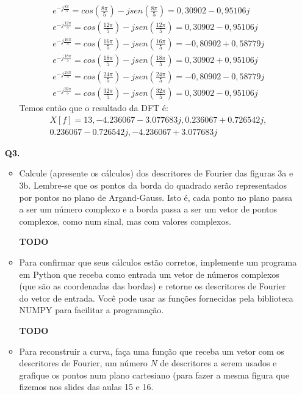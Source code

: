 \documentclass[12pt]{article}
\begin{document}
\begin{itemize}
\begin{itemize}
\begin{align*}
    &e^{-j\frac{8\pi}{5}} = cos(\frac{8\pi}{5}) - jsen(\frac{8\pi}{5}) = 0,30902  - 0,95106j &\\
    &e^{-j\frac{12\pi}{5}} = cos(\frac{12\pi}{5}) - jsen(\frac{12\pi}{5}) = 0,30902	-0,95106j &\\
    &e^{-j\frac{16\pi}{5}} = cos(\frac{16\pi}{5}) - jsen(\frac{16\pi}{5}) = -0,80902 + 0,58779j &\\
    &e^{-j\frac{18\pi}{5}} = cos(\frac{18\pi}{5}) - jsen(\frac{18\pi}{5}) = 0,30902 + 0,95106j &\\
    &e^{-j\frac{24\pi}{5}} = cos(\frac{24\pi}{5}) - jsen(\frac{24\pi}{5}) = -0,80902 - 0,58779j &\\
    &e^{-j\frac{32\pi}{5}} = cos(\frac{32\pi}{5}) - jsen(\frac{32\pi}{5}) = 0,30902	- 0,95106j&
\end{align*}
Temos então que o resultado da DFT é:
\begin{multline*}
    X[f] = 13, -4.236067-3.077683j, 0.236067+0.726542j, \\
           0.236067-0.726542j, -4.236067+3.077683j
\end{multline*}

\end{itemize}
%
%
%
\item[{\bf Q3.}] 
\begin{itemize}
\item Calcule (apresente os cálculos) dos descritores de Fourier das
  figuras 3a e 3b. Lembre-se que os pontos da
  borda do quadrado serão representados por pontos no plano de
  Argand-Gauss. Isto é, cada ponto no plano passa a ser um número
  complexo e a borda passa a ser um vetor de pontos complexos, como
  num sinal, mas com valores complexos.

\textbf{TODO}

\item Para confirmar que seus cálculos estão corretos, implemente um
  programa em Python que receba como entrada um vetor de números
  complexos (que são as coordenadas das bordas) e retorne os
  descritores de Fourier do vetor de entrada. Você pode usar as
  funções fornecidas pela biblioteca NUMPY para facilitar a
  programação.
  
\textbf{TODO}

\item Para reconstruir a curva, faça uma função que receba um vetor
  com os descritores de Fourier, um número $N$ de descritores a serem
  usados e grafique os pontos num plano cartesiano (para fazer a mesma 
figura que fizemos nos slides das aulas 15 e 16.


\end{itemize}
\end{itemize}
\end{document}
